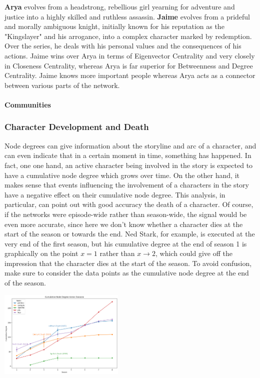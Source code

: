 \documentclass[10pt,twocolumn,letterpaper]{article}
\begin{document}
\textbf{Arya} evolves from a headstrong, rebellious girl yearning for adventure and justice into a highly skilled and ruthless assassin. \textbf{Jaime} evolves from a prideful and morally ambiguous knight, initially known for his reputation as the "Kingslayer" and his arrogance, into a complex character marked by redemption. Over the series, he deals with his personal values and the consequences of his actions. Jaime wins over Arya in terms of Eigenvector Centrality and very closely in Closeness Centrality, whereas Arya is far superior for Betweenness and Degree Centrality. Jaime knows more important people whereas Arya acts as a connector between various parts of the network.


\paragraph{Communities}



\subsubsection{Character Development and Death}

Node degrees can give information about the storyline and arc of a character, and can even indicate that in a certain moment in time, something has happened.
In fact, one one hand, an active character being involved in the story is expected to have a cumulative node degree which grows over time. On the other hand, it makes sense that events influencing the involvement of a characters in the story have a negative effect on their cumulative node degree. This analysis, in particular, can point out with good accuracy the death of a character. Of course, if the networks were episode-wide rather than season-wide, the signal would be even more accurate, since here we don't know whether a character dies at the start of the season or towards the end. Ned Stark, for example, is executed at the very end of the first season, but his cumulative degree at the end of season 1 is graphically on the point $x=1$ rather than $x\xrightarrow{}2$, which could give off the impression that the character dies at the start of the season. To avoid confusion, make sure to consider the data points as the cumulative node degree at the end of the season. 

\begin{center}
    \includegraphics[width=0.45\textwidth]{img/all_seasons/csum_degree.jpg}
\end{center}
\end{document}
